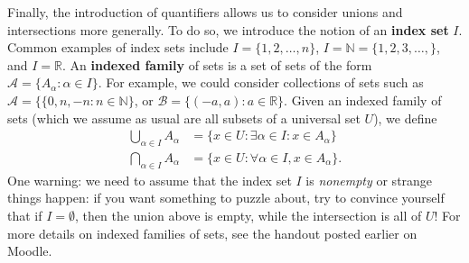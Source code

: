 \documentclass[letterpaper,12pt]{article}
\newcommand{\N}{\mathbb{N}}
\newcommand{\R}{\mathbb{R}}
\begin{document}
Finally, the introduction of quantifiers allows us to consider unions and intersections more generally. To do so, we introduce the notion of an {\bf index set} $I$. Common examples of index sets include $I = \{1,2,\ldots, n\}$, $I=\N = \{1,2,3,\ldots,\}$, and $I=\R$. An {\bf indexed family} of sets is a set of sets of the form $\mathcal{A} = \{A_\alpha : \alpha\in I\}$. For example, we could consider collections of sets such as $\mathcal{A} = \{\{0,n,-n : n\in\N\}$, or $\mathcal{B} = \{(-a,a) : a\in \R\}$. Given an indexed family of sets (which we assume as usual are all subsets of a universal set $U$), we define
\begin{align*}
\bigcup_{\alpha\in I} A_\alpha &= \{x\in U : \exists \alpha\in I: x\in A_\alpha\}\\
\bigcap_{\alpha\in I} A_\alpha &= \{x\in U : \forall \alpha\in I, x\in A_\alpha\}.
\end{align*}
One warning: we need to assume that the index set $I$ is {\em nonempty} or strange things happen: if you want something to puzzle about, try to convince yourself that if $I=\emptyset$, then the union above is empty, while the intersection is all of $U$! For more details on indexed families of sets, see the handout posted earlier on Moodle.
\end{document}
